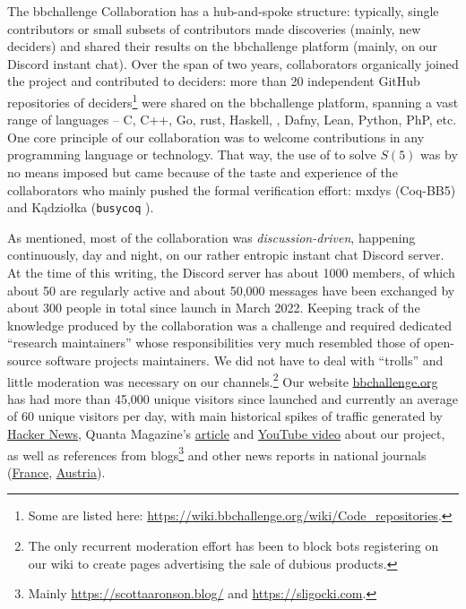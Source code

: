 \documentclass[a4paper,british]{article}
\theoremstyle{definition} %
\numberwithin{equation}{section}
\theoremstyle{definition} %
\newcommand{\CoqBB}{Coq-BB5\xspace}
\begin{document}
The bbchallenge Collaboration has a hub-and-spoke structure: typically, single contributors or small subsets of contributors made discoveries (mainly, new deciders) and shared their results on the bbchallenge platform (mainly, on our Discord instant chat). Over the span of two years, collaborators organically joined the project and contributed to deciders: more than 20 independent GitHub repositories of deciders\footnote{Some are listed here: \url{https://wiki.bbchallenge.org/wiki/Code_repositories}.} were shared on the bbchallenge platform, spanning a vast range of languages -- C, C++, Go, rust, Haskell, \Coq, Dafny, Lean, Python, PhP, etc. One core principle of our collaboration was to welcome contributions in any programming language or technology. That way, the use of \Coq to solve $S(5)$ was by no means imposed but came because of the taste and experience of the collaborators who mainly pushed the formal verification effort: mxdys (\CoqBB) and Kądziołka (\texttt{busycoq} \cite{busycoq}).


As mentioned, most of the collaboration was \textit{discussion-driven}, happening continuously, day and night, on our rather entropic instant chat Discord server. At the time of this writing, the Discord server has about 1000 members, of which about 50 are regularly active and about 50,000 messages have been exchanged by about 300 people in total since launch in March 2022. Keeping track of the knowledge produced by the collaboration was a challenge and required dedicated ``research maintainers'' whose responsibilities very much resembled those of open-source software projects maintainers. We did not have to deal with ``trolls'' and little moderation was necessary on our channels.\footnote{The only recurrent moderation effort has been to block bots registering on our wiki to create pages advertising the sale of dubious products.} Our website \href{https://bbchallenge.or}{bbchallenge.org} has had more than 45,000 unique visitors since launched and currently an average of 60 unique visitors per day, with main historical spikes of traffic generated by \href{https://news.ycombinator.com/item?id=34689081}{Hacker News},  Quanta Magazine's \href{https://www.quantamagazine.org/amateur-mathematicians-find-fifth-busy-beaver-turing-machine-20240702/}{article} and \href{https://www.youtube.com/watch?v=rmx3FBPzDuk}{YouTube video} about our project, as well as references from blogs\footnote{Mainly \url{https://scottaaronson.blog/} and \url{https://sligocki.com}.} and other news reports in national journals (\href{https://www.lemonde.fr/sciences/article/2024/07/17/mathematiques-le-defi-du-castor-affaire-resolu_6251337_1650684.html}{France}, \href{https://www.derstandard.de/story/3000000249211/durchbruch-beim-mathematischen-problem-des-fleissigen-bibers}{Austria}).
\end{document}
